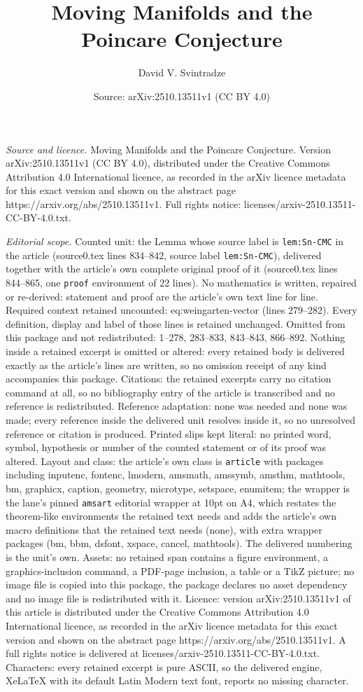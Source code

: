 \documentclass[10pt,a4paper]{amsart}
\title[Moving Manifolds and the Poincare Conjecture]{Moving Manifolds and the Poincare Conjecture}
\author{David V. Svintradze}
\date{Source: arXiv:2510.13511v1 (CC BY 4.0)}
\begin{document}
\maketitle

\noindent\emph{Source and licence.} Moving Manifolds and the Poincare Conjecture. Version arXiv:2510.13511v1 (CC BY 4.0), distributed under the Creative Commons Attribution 4.0 International licence, as recorded in the arXiv licence metadata for this exact version and shown on the abstract page https://arxiv.org/abs/2510.13511v1. Full rights notice: licenses/arxiv-2510.13511-CC-BY-4.0.txt.\par\smallskip

\noindent\textit{Editorial scope.} Counted unit: the Lemma whose source label is \texttt{lem:Sn-CMC} in the article (source0.tex lines 834--842, source label \texttt{lem:Sn-CMC}), delivered together with the article's own complete original proof of it (source0.tex lines 844--865, one \texttt{proof} environment of 22 lines). No mathematics is written, repaired or re-derived: statement and proof are the article's own text line for line. Required context retained uncounted: eq:weingarten-vector (lines 279--282). Every definition, display and label of those lines is retained unchanged. Omitted from this package and not redistributed: 1--278, 283--833, 843--843, 866--892. Nothing inside a retained excerpt is omitted or altered: every retained body is delivered exactly as the article's lines are written, so no omission receipt of any kind accompanies this package. Citations: the retained excerpts carry no citation command at all, so no bibliography entry of the article is transcribed and no reference is redistributed. Reference adaptation: none was needed and none was made; every reference inside the delivered unit resolves inside it, so no unresolved reference or citation is produced. Printed slips kept literal: no printed word, symbol, hypothesis or number of the counted statement or of its proof was altered. Layout and class: the article's own class is \texttt{article} with packages including inputenc, fontenc, lmodern, amsmath, amssymb, amsthm, mathtools, bm, graphicx, caption, geometry, microtype, setspace, enumitem; the wrapper is the lane's pinned \texttt{amsart} editorial wrapper at 10pt on A4, which restates the theorem-like environments the retained text needs and adds the article's own macro definitions that the retained text needs (none), with extra wrapper packages (bm, bbm, dsfont, xspace, cancel, mathtools). The delivered numbering is the unit's own. Assets: no retained span contains a figure environment, a graphics-inclusion command, a PDF-page inclusion, a table or a TikZ picture; no image file is copied into this package, the package declares no asset dependency and no image file is redistributed with it. Licence: version arXiv:2510.13511v1 of this article is distributed under the Creative Commons Attribution 4.0 International licence, as recorded in the arXiv licence metadata for this exact version and shown on the abstract page https://arxiv.org/abs/2510.13511v1. A full rights notice is delivered at licenses/arxiv-2510.13511-CC-BY-4.0.txt. Characters: every retained excerpt is pure ASCII, so the delivered engine, XeLaTeX with its default Latin Modern text font, reports no missing character.
\end{document}
